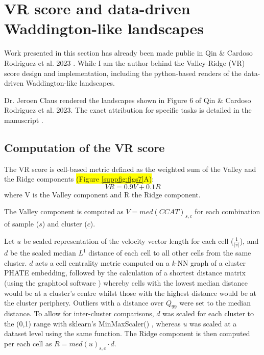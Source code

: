 \section{VR score and data-driven Waddington-like landscapes}

Work presented in this section has already been made public in Qin \& Cardoso Rodriguez et al. 2023 \cite{cardoso_rodriguez_single-cell_2023}. While I am the author behind the Valley-Ridge (VR) score design and implementation, including the python-based renders of the data-driven Waddington-like landscapes. 

Dr. Jeroen Claus rendered the landscapes shown in Figure 6 of Qin \& Cardoso Rodriguez et al. 2023. The exact attribution for specific tasks is detailed in the manuscript \cite{cardoso_rodriguez_single-cell_2023}.

\subsection{Computation of the VR score}

The VR score is cell-based metric defined as the weighted sum of the Valley and the Ridge components \colorbox{yellow}{(Figure \ref{suppfig:figs7}A)}:
\[VR = 0.9V+0.1R\]
where V is the Valley component and R the Ridge component.

The Valley component is computed as \(V = med(CCAT)_{s,c}\) for each combination of sample (\(s\)) and cluster (\(c\)). 

Let $u$ be scaled representation of the velocity vector length for each cell ($\frac{1}{|v|}$), and $d$ be the scaled median $L^1$ distance of each cell to all other cells from the same cluster. $d$ acts a cell centrality metric computed on a \emph{k}-NN graph of a cluster PHATE embedding, followed by the calculation of a shortest distance matrix (using the graphtool software \cite{peixoto_graph-tool_2014}) whereby cells with the lowest median distance would be at a cluster's centre whilst those with the highest distance would be at the cluster periphery. Outliers with a distance over $Q_{99}$ were set to the median distance. 
To allow for inter-cluster comparisons, $d$ was scaled for each cluster to the (0,1) range with sklearn's MinMaxScaler() \cite{pedregosa_scikit-learn_2011}, whereas $u$ was scaled at a dataset level using the same function.
The Ridge component is then computed per each cell as $R = med(u)_{s,c} \cdot d$. 

